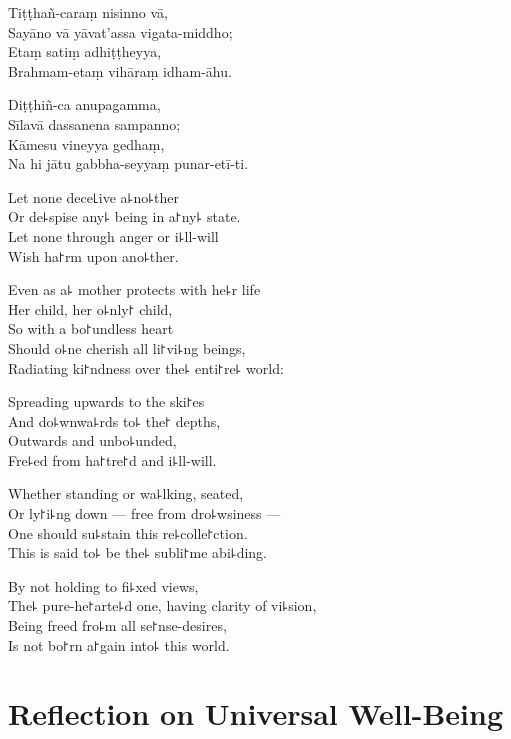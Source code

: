 Tiṭṭhañ-caraṃ nisinno vā,\\
Sayāno vā yāvat'assa vigata-middho;\\
Etaṃ satiṃ adhiṭṭheyya,\\
Brahmam-etaṃ vihāraṃ idham-āhu.

Diṭṭhiñ-ca anupagamma,\\
Sīlavā dassanena sampanno;\\
Kāmesu vineyya gedhaṃ,\\
Na hi jātu gabbha-seyyaṃ punar-etī-ti.

\clearpage

Let none dece꜖ive a꜕no꜕ther\\%
Or de꜕spise any꜕ being in a꜓ny꜕ state.\\
Let none through anger or i꜕ll-will\\
Wish ha꜓rm upon ano꜕ther.

Even as a꜕ mother protects with he꜕r life\\
Her child, her o꜕nly꜓ child,\\
So with a bo꜓undless heart\\
Should o꜕ne cherish all li꜓vi꜕ng beings,\\
Radiating ki꜓ndness over the꜕ enti꜓re꜕ world:

Spreading upwards to the ski꜓es\\
And do꜕wnwa꜕rds to꜕ the꜓ depths,\\
Outwards and unbo꜕unded,\\
Fre꜕ed from ha꜓tre꜓d and i꜕ll-will.

Whether standing or wa꜕lking, seated, \\
Or ly꜓i꜕ng down --- free from dro꜕wsiness ---\\
One should su꜕stain this re꜕colle꜓ction.\\
This is said to꜕ be the꜕ subli꜓me abi꜕ding.

By not holding to fi꜕xed views,\\
The꜕ pure-he꜓arte꜕d one, having clarity of vi꜕sion,\\
Being freed fro꜕m all se꜓nse-desires,\\
Is not bo꜓rn a꜓gain into꜕ this world.

\chapter*[Universal Well-Being]{Reflection on Universal Well-Being}%

\delegateSetUseNext


